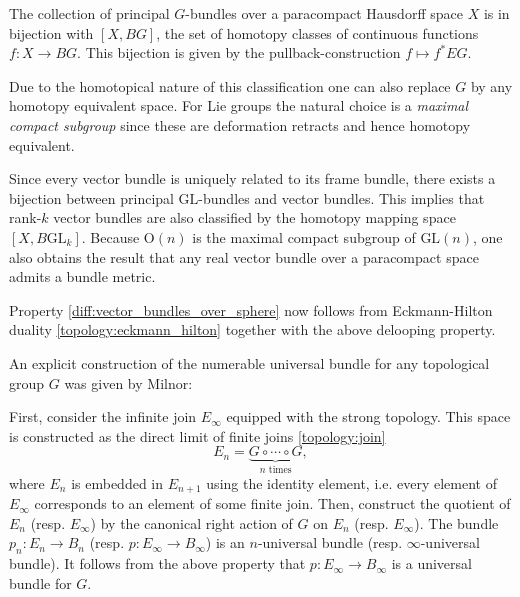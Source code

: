     \begin{property}[Classification]\label{diff:classification}
        The collection of principal $G$-bundles over a paracompact Hausdorff space $X$ is in bijection with $[X,BG]$, the set of homotopy classes of continuous functions $f:X\rightarrow BG$. This bijection is given by the pullback-construction $f\mapsto f^*EG$.

        Due to the homotopical nature of this classification one can also replace $G$ by any homotopy equivalent space. For Lie groups the natural choice is a \textit{maximal compact subgroup} since these are deformation retracts and hence homotopy equivalent.
    \end{property}
    \begin{result}
        Since every vector bundle is uniquely related to its frame bundle, there exists a bijection between principal $\text{GL}$-bundles and vector bundles. This implies that rank-$k$ vector bundles are also classified by the homotopy mapping space $[X,B\text{GL}_k]$. Because $\text{O}(n)$ is the maximal compact subgroup of $\text{GL}(n)$, one also obtains the result that any real vector bundle over a paracompact space admits a bundle metric.

        Property \ref{diff:vector_bundles_over_sphere} now follows from Eckmann-Hilton duality \ref{topology:eckmann_hilton} together with the above delooping property.
    \end{result}


    An explicit construction of the numerable universal bundle for any topological group $G$ was given by Milnor:
    \begin{construct}
        First, consider the infinite join $E_\infty$ equipped with the strong topology. This space is constructed as the direct limit of finite joins \ref{topology:join} \[E_n=\underbrace{G\circ\cdots\circ G}_{n\text{ times}},\] where $E_n$ is embedded in $E_{n+1}$ using the identity element, i.e. every element of $E_\infty$ corresponds to an element of some finite join. Then, construct the quotient of $E_n$ (resp. $E_\infty$) by the canonical right action of $G$ on $E_n$ (resp. $E_\infty$). The bundle $p_n:E_n\rightarrow B_n$ (resp. $p:E_\infty\rightarrow B_\infty$) is an $n$-universal bundle (resp. $\infty$-universal bundle). It follows from the above property that $p:E_\infty\rightarrow B_\infty$ is a universal bundle for $G$.
    \end{construct}

